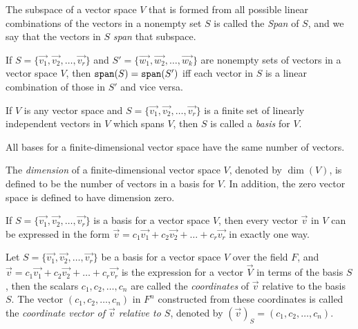 \documentclass{report}
\begin{document}
		\begin{defn}[Span]
			The subspace of a vector space $V$ that is formed from all possible linear combinations of the vectors in a nonempty set $S$ is called the \emph{Span} of $S$, and we say that the vectors in $S$ \emph{span} that subspace.
		\end{defn}
	
		\begin{thm}
			If $S=\{\vec{v_1}, \vec{v_2}, \dots, \vec{v_r}\}$ and $S'=\{\vec{w_1}, \vec{w_2}, \dots, \vec{w_k}\}$ are nonempty sets of vectors in a vector space $V$, then $\verb|span|(S)=\verb|span|(S')$ iff each vector in $S$ is a linear combination of those in $S'$ and vice versa.
		\end{thm}

		\begin{defn}[Basis]
			If $V$ is any vector space and $S=\{\vec{v_1}, \vec{v_2}, \dots, \vec{v_r}\}$ is a finite set of linearly independent vectors in $V$ which spans $V$, then $S$ is called a \emph{basis} for $V$.
		\end{defn}
	
		\begin{thm}
			All bases for a finite-dimensional vector space have the same number of vectors.
		\end{thm}
		
		\begin{defn}[Dimension]
			The \emph{dimension} of a finite-dimensional vector space $V$, denoted by $\dim (V)$, is defined to be the number of vectors in a basis for $V$. In addition, the zero vector space is defined to have dimension zero.
		\end{defn}
	
		\begin{thm}
			If $S=\{\vec{v_1}, \vec{v_2}, \dots, \vec{v_r}\}$ is a basis for a vector space $V$, then every vector $\vec{v}$ in $V$ can be expressed in the form $\vec{v}=c_1\vec{v_1}+c_2\vec{v_2}+\dots+c_r\vec{v_r}$ in exactly one way.
		\end{thm}
	
		\begin{defn}[Coordinate]
			Let $S=\{\vec{v_1}, \vec{v_2}, \dots, \vec{v_r}\}$ be a basis for a vector space $V$ over the field $F$, and $\vec{v}=c_1\vec{v_1}+c_2\vec{v_2}+\dots+c_r\vec{v_r}$ is the expression for a vector $\vec{V}$ in terms of the basis $S$, then the scalars $c_1,c_2,\dots,c_n$ are called the \emph{coordinates} of $\vec{v}$ relative to the basis $S$. The vector $(c_1,c_2,\dots,c_n)$ in $F^n$ constructed from these coordinates is called the \emph{coordinate vector of $\vec{v}$ relative to $S$}, denoted by $(\vec{v})_S=(c_1,c_2,\dots,c_n)$.
		\end{defn}
\end{document}
